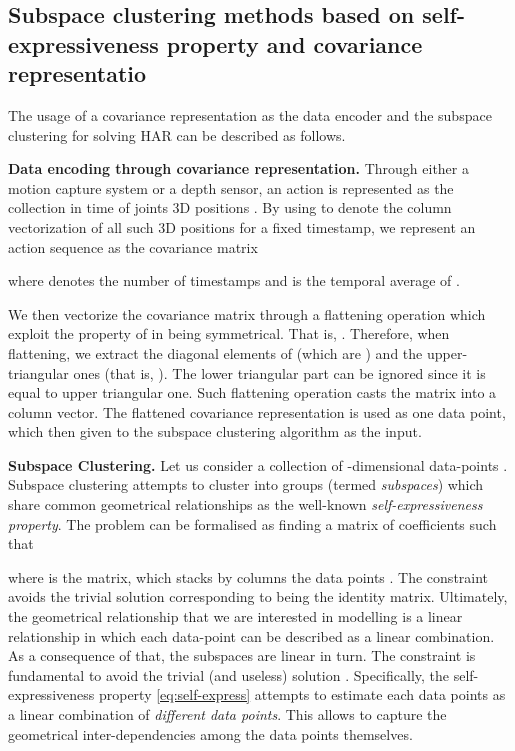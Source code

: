 \documentclass[10pt,a4paper,conference]{IEEEtran}
\begin{document}
\subsection{Subspace clustering methods based on self-expressiveness property and covariance representatio}\label{sec:SSC}



The usage of a covariance representation as the data encoder and the subspace clustering for solving HAR can be described as follows. 

{\bf Data encoding through covariance representation.} Through either a motion capture system or a depth sensor, an action is represented as the collection in time of  joints 3D positions .
By using  to denote the column vectorization of all such 3D positions for a fixed timestamp, we represent an action sequence as the covariance matrix

where  denotes the number of timestamps and  is the temporal average of . 

We then vectorize the covariance matrix through a flattening operation which exploit the property of  in being symmetrical.
That is, .
Therefore, when flattening, we extract the diagonal elements of  (which are ) and the upper-triangular ones (that is, ).
The lower triangular part can be ignored since it is equal to upper triangular one.
Such flattening operation casts the  matrix  into a  column vector. The flattened covariance representation is used as one data point, which then given to the subspace clustering algorithm as the input.

{\bf Subspace Clustering.} Let us consider a collection of -dimensional data-points .
Subspace clustering \cite{vidal2011subspace} attempts to cluster  into groups (termed \emph{subspaces}) which share common geometrical relationships as the well-known \emph{self-expressiveness property}.
The problem can be formalised as finding a  matrix  of coefficients such that
 
where  is the  matrix, which stacks by columns the data points . The constraint  avoids the trivial solution corresponding to  being the identity matrix.
Ultimately, the geometrical relationship that we are interested in modelling is a linear relationship in which each data-point can be described as a linear combination. As a consequence of that, the subspaces are linear in turn.
The constraint  is fundamental to avoid the trivial (and useless) solution . Specifically, the self-expressiveness property \eqref{eq:self-express} attempts to estimate each data points as a linear combination of \emph{different data points}. This allows to capture the geometrical inter-dependencies among the data points themselves.
\end{document}
